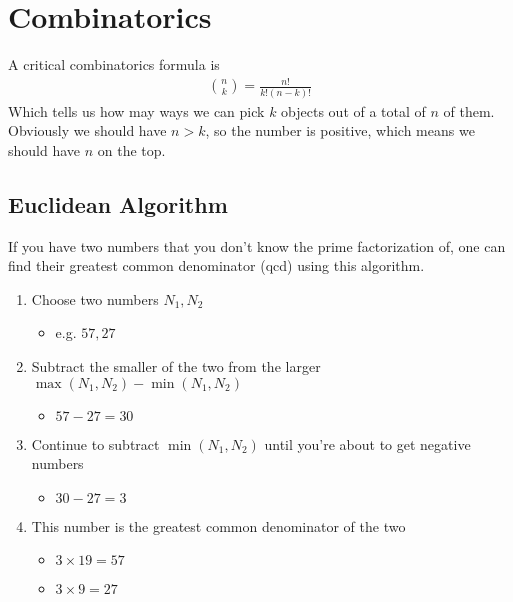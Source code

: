\section{Combinatorics}
A critical combinatorics formula is 
\begin{align}
{{n}\choose{k}} = \frac{n!}{k!(n-k)!}
\end{align}
Which tells us how may ways we can pick $k$ objects out of a total of $n$ of them. Obviously we should have $n>k$, so the number is positive, which means we should have $n$ on the top.


\subsection{Euclidean Algorithm}

If you have two numbers that you don't know the prime factorization of, one can find their greatest common denominator (qcd) using this algorithm. 
\begin{enumerate}
\item Choose two numbers $N_1, N_2$ 
\begin{itemize}
\item	e.g. $57, 27$
\end{itemize}
\item Subtract the smaller of the two from the larger $\max(N_1,N_2) -\min(N_1,N_2)$
\begin{itemize}
\item	$57 -27 = 30$
\end{itemize}
\item Continue to subtract $\min(N_1,N_2)$ until you're about to get negative numbers
\begin{itemize}
\item $30 -27 = 3$
\end{itemize}
\item This number is the greatest common denominator of the two
\begin{itemize}
\item $3\times 19 = 57$
\item $3 \times 9 = 27$
\end{itemize}
\end{enumerate}








